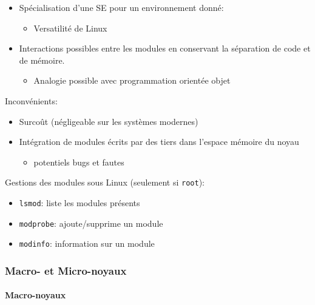 \begin{itemize}
\tightlist
\item
  Spécialisation d'une SE pour un environnement donné:

  \begin{itemize}
  \tightlist
  \item
    Versatilité de Linux
  \end{itemize}
\item
  Interactions possibles entre les modules en conservant la séparation
  de code et de mémoire.

  \begin{itemize}
  \tightlist
  \item
    Analogie possible avec programmation orientée objet
  \end{itemize}
\end{itemize}

Inconvénients:

\begin{itemize}
\tightlist
\item
  Surcoût (négligeable sur les systèmes modernes)
\item
  Intégration de modules écrits par des tiers dans l'espace mémoire du
  noyau

  \begin{itemize}
  \tightlist
  \item
    potentiels bugs et fautes
  \end{itemize}
\end{itemize}

Gestions des modules sous Linux (seulement si \texttt{root}):

\begin{itemize}
\tightlist
\item
  \texttt{lsmod}: liste les modules présents
\item
  \texttt{modprobe}: ajoute/supprime un module
\item
  \texttt{modinfo}: information sur un module
\end{itemize}

\subsubsection{Macro- et Micro-noyaux}\label{macro--et-micro-noyaux}

\paragraph{Macro-noyaux}\label{macro-noyaux}


